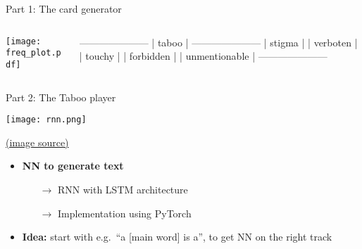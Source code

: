 \documentclass[11pt]{beamer}
\begin{document}
\begin{frame}[fragile]{Part 1: The card generator}



\begin{columns}
	
\begin{column}{0.65\textwidth}

\begin{center}
	\texttt{[image: freq\_plot.pdf]}
\end{center}

\end{column}

\begin{column}{0.35\textwidth}

\vspace{-\baselineskip}

{\scriptsize
\begin{semiverbatim}
---------------------
|   taboo           |
---------------------
|   stigma          |
|   verboten        |
|   touchy          |
|   forbidden       |
|   unmentionable   |
---------------------
\end{semiverbatim}
}
\end{column}

\end{columns}

\end{frame}




\begin{frame}{Part 2: The Taboo player}
	
\begin{center}
		\texttt{[image: rnn.png]}
\end{center}

\hfill {\tiny \href{https://tex.stackexchange.com/questions/364413/drawing-an-unfolded-recurrent-neural-network}{(image source)} }
	
	\begin{itemize}
		\item \textbf{NN to generate text}
		\begin{itemize}
			\item[$\rightarrow$] RNN with LSTM architecture
			\item[$\rightarrow$] Implementation using PyTorch
		\end{itemize}
		\item \textbf{Idea:} start with e.g.\ ``a [main word] is a'', to get NN on the right track
	\end{itemize}
	
\end{frame}


%
%
%

\end{document}
